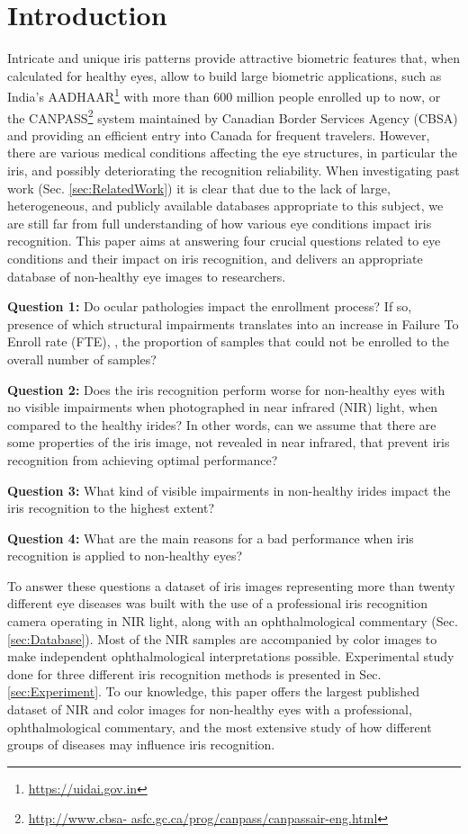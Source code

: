 \documentclass[10pt,twocolumn,letterpaper]{article}
\begin{document}
\section{Introduction}

Intricate and unique iris patterns provide attractive biometric features that, when calculated for healthy eyes, allow to build large biometric applications, such as India's AADHAAR\footnote{\url{https://uidai.gov.in}} with more than 600 million people enrolled up to now, or the CANPASS\footnote{\url{http://www.cbsa- asfc.gc.ca/prog/canpass/canpassair-eng.html}} system maintained by Canadian Border Services Agency (CBSA) and providing an efficient entry into Canada for frequent travelers. However, there are various medical conditions affecting the eye structures, in particular the iris, and possibly deteriorating the recognition reliability. When investigating past work (Sec. \ref{sec:RelatedWork}) it is clear that due to the lack of large, heterogeneous, and publicly available databases appropriate to this subject, we are still far from full understanding of how various eye conditions impact iris recognition. This paper aims at answering four crucial questions related to eye conditions and their impact on iris recognition, and delivers an appropriate database of non-healthy eye images to researchers.

{\bf Question 1:} Do ocular pathologies impact the enrollment process? If so, presence of which structural impairments translates into an increase in Failure To Enroll rate (FTE), \ie, the proportion of samples that could not be enrolled to the overall number of samples?

{\bf Question 2:} Does the iris recognition perform worse for non-healthy eyes with no visible impairments when photographed in near infrared (NIR) light, when compared to the healthy irides? In other words, can we assume that there are some properties of the iris image, not revealed in near infrared, that prevent iris recognition from achieving optimal performance?
  
{\bf Question 3:} What kind of visible impairments in non-healthy irides impact the iris recognition to the highest extent?

{\bf Question 4:} What are the main reasons for a bad performance when iris recognition is applied to non-healthy eyes?

To answer these questions a dataset of iris images representing more than twenty different eye diseases was built with the use of a professional iris recognition camera operating in NIR light, along with an ophthalmological commentary (Sec. \ref{sec:Database}). Most of the NIR samples are accompanied by color images to make independent ophthalmological interpretations possible. Experimental study done for three different iris recognition methods is presented in Sec. \ref{sec:Experiment}. To our knowledge, this paper offers the largest published dataset of NIR and color images for non-healthy eyes with a professional, ophthalmological commentary, and the most extensive study of how different groups of diseases may influence iris recognition.
\end{document}
